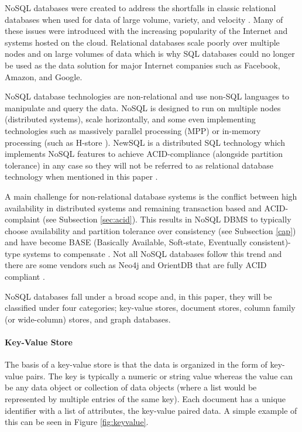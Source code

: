 NoSQL databases were created to address the shortfalls in classic relational databases when used for data of large volume, variety, and velocity \cite{nosql-db}. Many of these issues were introduced with the increasing popularity of the Internet and systems hosted on the cloud. Relational databases scale poorly over multiple nodes and on large volumes of data which is why SQL databases could no longer be used as the data solution for major Internet companies such as Facebook, Amazon, and Google. 

NoSQL database technologies are non-relational and use non-SQL languages to manipulate and query the data. NoSQL is designed to run on multiple nodes (distributed systems), scale horizontally, and some even implementing technologies such as massively parallel processing (MPP) \cite{tigergraph-mpp} or in-memory processing (such as H-store \cite{hstore}). NewSQL is a distributed SQL technology which implements NoSQL features to achieve ACID-compliance (alongside partition tolerance) in any case so they will not be referred to as relational database technology when mentioned in this paper \cite{nosql-db}.

A main challenge for non-relational database systems is the conflict between high availability in distributed systems and remaining transaction based and ACID-complaint (see Subsection \ref{sec:acid}). This results in NoSQL DBMS to typically choose availability and partition tolerance over consistency (see Subsection \ref{cap}) and have become BASE (Basically Available, Soft-state, Eventually consistent)-type systems to compensate \cite{base}. Not all NoSQL databases follow this trend and there are some vendors such as Neo4j and OrientDB that are fully ACID compliant \cite{acid}.

NoSQL databases fall under a broad scope and, in this paper, they will be classified under four categories; key-value stores, document stores, column family (or wide-column) stores, and graph databases.

\paragraph{Key-Value Store}

The basis of a key-value store is that the data is organized in the form of key-value pairs. The key is typically a numeric or string value whereas the value can be any data object or collection of data objects (where a list would be represented by multiple entries of the same key). Each document has a unique identifier with a list of attributes, the key-value paired data. A simple example of this can be seen in Figure \ref{fig:keyvalue}.

